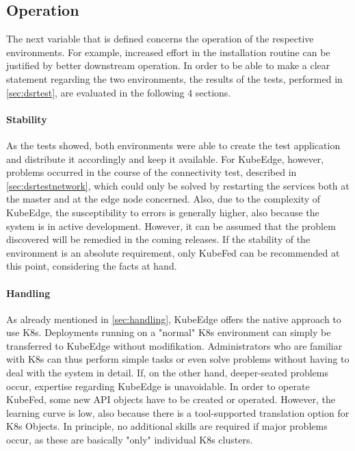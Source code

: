 \documentclass[MSC,Master,english]{twbook}%
\begin{document}
\subsection{Operation}
\label{sec:catops}
The next variable that is defined concerns the operation of the respective environments. For example, increased effort in the installation routine can be justified by better downstream operation. In order to be able to make a clear statement regarding the two environments, the results of the tests, performed in \autoref{sec:dsrtest}, are evaluated in the following 4 sections.

\paragraph{Stability} As the tests showed, both environments were able to create the test application and distribute it accordingly and keep it available. For KubeEdge, however, problems occurred in the course of the connectivity test, described in \autoref{sec:dsrtestnetwork}, which could only be solved by restarting the services both at the master and at the edge node concerned. Also, due to the complexity of KubeEdge, the susceptibility to errors is generally higher, also because the system is in active development. However, it can be assumed that the problem discovered will be remedied in the coming releases. If the stability of the environment is an absolute requirement, only KubeFed can be recommended at this point, considering the facts at hand.

\paragraph{Handling} As already mentioned in \autoref{sec:handling}, KubeEdge offers the native approach to use K8s. Deployments running on a "normal" \ac{K8s} environment can simply be transferred to KubeEdge without modifikation. Administrators who are familiar with K8s can thus perform simple tasks or even solve problems without having to deal with the system in detail. If, on the other hand, deeper-seated problems occur, expertise regarding KubeEdge is unavoidable. In order to operate KubeFed, some new API objects have to be created or operated. However, the learning curve is low, also because there is a tool-supported translation option for \ac{K8s} Objects. In principle, no additional skills are required if major problems occur, as these are basically "only" individual \ac{K8s} clusters.
\end{document}
